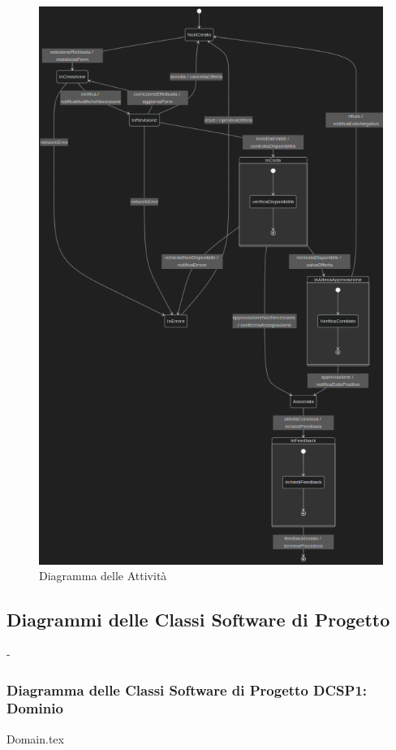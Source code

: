 \documentclass[12pt]{article}
\begin{document}
\begin{figure}[H]
    \includegraphics[width=\textwidth, height=\textheight,keepaspectratio]{Immagini/DS/Iterazione 1/DSOfferteVolontario.png}
        \caption{Diagramma delle Attività}
        \label{fig:diagrammaDS2}
\end{figure}

\subsection{Diagrammi delle Classi Software di Progetto}-

\subsubsection{Diagramma delle Classi Software di Progetto DCSP1: Dominio}
{Domain.tex}
\end{document}
